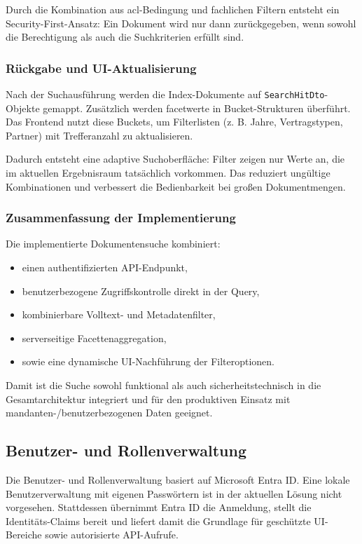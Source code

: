 Durch die Kombination aus \acrshort{acl}-Bedingung und fachlichen Filtern entsteht ein Security-First-Ansatz: Ein Dokument wird nur dann zurückgegeben, wenn sowohl die Berechtigung als auch die Suchkriterien erfüllt sind.

\subsubsection{Rückgabe und UI-Aktualisierung}

Nach der Suchausführung werden die Index-Dokumente auf \texttt{SearchHitDto}-Objekte gemappt. Zusätzlich werden \gls{facet}werte in Bucket-Strukturen überführt. Das Frontend nutzt diese Buckets, um Filterlisten (z. B. Jahre, Vertragstypen, Partner) mit Trefferanzahl zu aktualisieren.

Dadurch entsteht eine adaptive Suchoberfläche: Filter zeigen nur Werte an, die im aktuellen Ergebnisraum tatsächlich vorkommen. Das reduziert ungültige Kombinationen und verbessert die Bedienbarkeit bei großen Dokumentmengen.

\subsubsection{Zusammenfassung der Implementierung}

Die implementierte Dokumentensuche kombiniert:
\begin{itemize}
    \item einen authentifizierten API-Endpunkt,
    \item benutzerbezogene Zugriffskontrolle direkt in der Query,
    \item kombinierbare Volltext- und Metadatenfilter,
    \item serverseitige Facettenaggregation,
    \item sowie eine dynamische UI-Nachführung der Filteroptionen.
\end{itemize}

Damit ist die Suche sowohl funktional als auch sicherheitstechnisch in die Gesamtarchitektur integriert und für den produktiven Einsatz mit mandanten-/benutzerbezogenen Daten geeignet.

\subsection{Benutzer- und Rollenverwaltung}\label{subsec:benutzer_und_rollenverwaltung}

Die Benutzer- und Rollenverwaltung basiert auf Microsoft Entra ID. Eine lokale
Benutzerverwaltung mit eigenen Passwörtern ist in der aktuellen Lösung nicht
vorgesehen. Stattdessen übernimmt Entra ID die Anmeldung, stellt die
Identitäts-Claims bereit und liefert damit die Grundlage für geschützte
UI-Bereiche sowie autorisierte API-Aufrufe.

